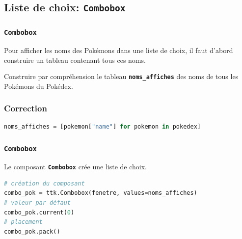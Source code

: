 \documentclass[svgnames,11pt]{beamer}
\begin{document}
\subsection{Liste de choix: \textbf{\texttt{Combobox}}}
\begin{frame}
    \frametitle{\textbf{\texttt{Combobox}}}

Pour afficher les noms des Pokémons dans une liste de choix, il faut d'abord construire un tableau contenant tous ces noms.
\begin{activite}
Construire par compréhension le tableau \textbf{\texttt{noms\_affiches}} des noms de tous les Pokémons du Pokédex.
\end{activite}

\end{frame}
\begin{frame}[fragile]
    \frametitle{Correction}

\begin{center}
\begin{lstlisting}[language=Python,basicstyle=\small,xleftmargin=0em,xrightmargin=0em,numbers=none]
noms_affiches = [pokemon["name"] for pokemon in pokedex]
\end{lstlisting}
\label{CODE}
\end{center}  

\end{frame}
\begin{frame}[fragile]
    \frametitle{\textbf{\texttt{Combobox}}}

    Le composant \textbf{\texttt{Combobox}} crée une liste de choix.
    \begin{center}
        \begin{lstlisting}[language=Python,basicstyle=\small]
# création du composant
combo_pok = ttk.Combobox(fenetre, values=noms_affiches)
# valeur par défaut
combo_pok.current(0)
# placement
combo_pok.pack()   
\end{lstlisting}
        \label{CODE}
    \end{center}

\end{frame}
\end{document}
